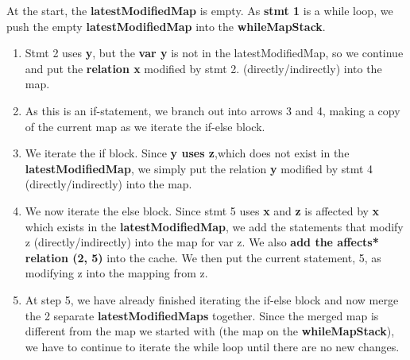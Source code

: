 \documentclass[12pt]{article}
\begin{document}
{{{{{{{{{{{{{{\begin{center}
\begin{minipage}{15em}
\begin{flushleft}
\end{flushleft}
\end{minipage}
\hspace{20mm}
\begin{minipage}{20em}
\normalsize
At the start, the \textbf{latestModifiedMap} is empty. As \textbf{stmt 1} is a while loop, we push the empty \textbf{latestModifiedMap} into the \textbf{whileMapStack}.
\begin{enumerate}
\item Stmt 2 uses \textbf{y}, but the \textbf{var y} is not in the latestModifiedMap, so we continue and put the \textbf{relation x} modified by stmt 2. (directly/indirectly) into the map.
\item As this is an if-statement, we branch out into arrows 3 and 4, making a copy of the current map as we iterate the if-else block.
\item We iterate the if block. Since \textbf{y uses z},which does not exist in the \textbf{latestModifiedMap}, we simply put the relation \textbf{y} modified by stmt 4 (directly/indirectly) into the map.
\item We now iterate the else block. Since stmt 5 uses \textbf{x} and \textbf{z} is affected by \textbf{x} which exists in the \textbf{latestModifiedMap}, we add the statements that modify z (directly/indirectly) into the map for var z. We also \textbf{add the affects* relation (2, 5)} into the cache. We then put the current statement, 5, as modifying z into the mapping from z.
\item At step 5, we have already finished iterating the if-else block and now merge the 2 separate \textbf{latestModifiedMaps} together. Since the merged map is different from the map we started with (the map on the \textbf{whileMapStack}), we have to continue to iterate the while loop until there are no new changes.
\end{enumerate}
\end{minipage}
\end{center}
\normalsize




}}}}}}}}}}}}}}
\end{document}
